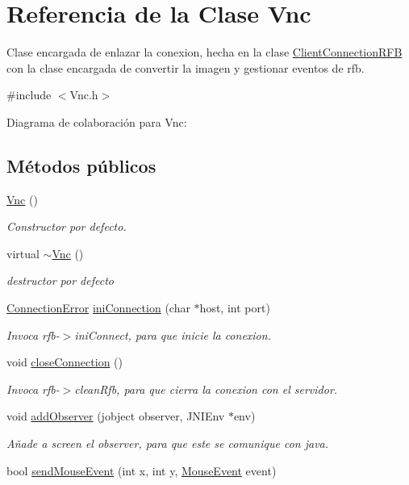 \hypertarget{classVnc}{\section{Referencia de la Clase Vnc}
\label{classVnc}
}


Clase encargada de enlazar la conexion, hecha en la clase \hyperlink{classClientConnectionRFB}{Client\-Connection\-R\-F\-B} con la clase encargada de convertir la imagen y gestionar eventos de rfb.  




{\ttfamily \#include $<$Vnc.\-h$>$}



Diagrama de colaboración para Vnc\-:
\subsection*{Métodos públicos}
\begin{DoxyCompactItemize}
\item 
\hyperlink{classVnc_a6fe654ca9108d8322b6d7325ad380e24}{Vnc} ()
\begin{DoxyCompactList}\small\item\em Constructor por defecto. \end{DoxyCompactList}\item 
virtual \hyperlink{classVnc_a0c6595fef85db5354c87d6bb5419b831}{$\sim$\-Vnc} ()
\begin{DoxyCompactList}\small\item\em destructor por defecto \end{DoxyCompactList}\item 
\hyperlink{CommonType_8h_a3eb2ebd912cc5460d23e45f7188a0a86}{Connection\-Error} \hyperlink{classVnc_a409b432af687e287ae403aa4eb72665d}{ini\-Connection} (char $\ast$host, int port)
\begin{DoxyCompactList}\small\item\em Invoca rfb-\/$>$ini\-Connect, para que inicie la conexion. \end{DoxyCompactList}\item 
void \hyperlink{classVnc_a2450126c5fdcb3d89473e60576219854}{close\-Connection} ()
\begin{DoxyCompactList}\small\item\em Invoca rfb-\/$>$clean\-Rfb, para que cierra la conexion con el servidor. \end{DoxyCompactList}\item 
void \hyperlink{classVnc_a5c8ce7fb97832fb21cd638b14b49843d}{add\-Observer} (jobject observer, J\-N\-I\-Env $\ast$env)
\begin{DoxyCompactList}\small\item\em Añade a screen el observer, para que este se comunique con java. \end{DoxyCompactList}\item 
bool \hyperlink{classVnc_a0df40ea1d639cf16e9b8b42229438715}{send\-Mouse\-Event} (int x, int y, \hyperlink{CommonType_8h_a5f278706f235727f39ae168af63b1d99}{Mouse\-Event} event)
\end{DoxyCompactItemize}
